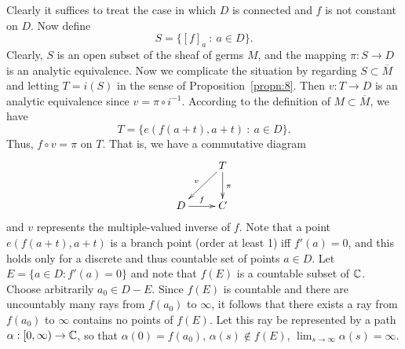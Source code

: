 \documentclass[a4paper,11pt]{article}
\begin{document}
\begin{myproof}
  Clearly it suffices to treat the case in which $D$ is connected and
  $f$ is not constant on $D$.  Now define
  $$
  S = \{ [f]_a ~:~ a \in D\}.
  $$
  Clearly, $S$ is an open subset of the sheaf of germs $M$, and the
  mapping $\pi : S \to D$ is an analytic equivalence.  Now we
  complicate the situation by regarding $S \subset \overline{M}$ and
  letting $T = i(S)$ in the sense of Proposition~\ref{propn:8}.  Then
  $v : T \to D$ is an analytic equivalence since $v = \pi \circ
  i^{-1}$.  According to the definition of $M \subset \overline{M}$,
  we have 
  $$
  T = \{e(f(a+t), a+t) ~:~ a \in D\}.
  $$
  Thus, $f \circ v = \pi$ on $T$.  That is, we have a commutative
  diagram
  $$
  \xymatrix{
    & T\ar[d]^{\pi} \ar[dl]_{v} \\
    D \ar[r]^f & C
    }
  $$
  and $v$ represents the multiple-valued inverse of $f$.  Note that a
  point $e(f(a+t), a+t)$ is a branch point (order at least 1) iff
  $f'(a) = 0$, and this holds only for a discrete and thus countable
  set of points $a \in D$.  Let $E = \{a \in D : f'(a) = 0\}$ and note
  that $f(E)$ is a countable subset of ${\mathbb C}$.  Choose arbitrarily
  $a_0 \in D - E$.  Since $f(E)$ is countable and there are
  uncountably many rays from $f(a_0)$ to $\infty$, it follows that
  there exists a ray from $f(a_0)$ to $\infty$ contains no points of
  $f(E)$.  Let this ray be represented by a path $\alpha : [0,\infty)
  \to {\mathbb C}$, so that $\alpha(0) = f(a_0)$, $\alpha(s) \notin f(E)$,
  $\lim_{s\to \infty} \alpha(s) = \infty$.


\end{myproof}
\end{document}
